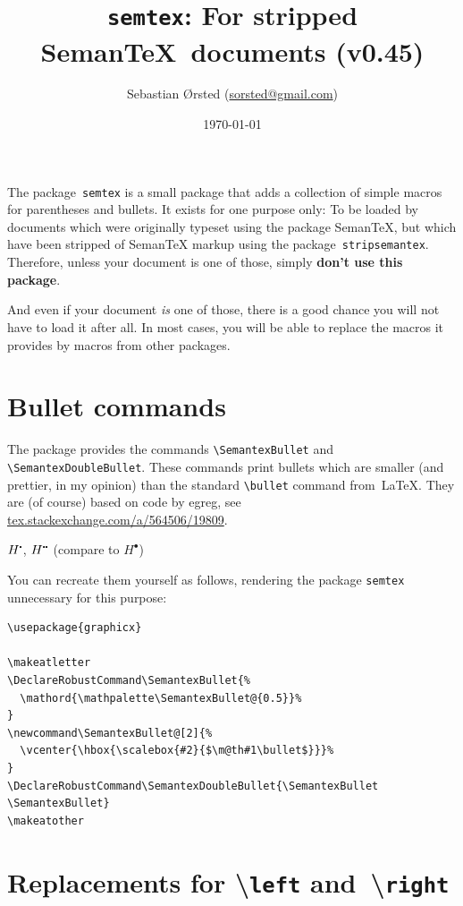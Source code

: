 \documentclass[a4paper,article,oneside,english,10pt]{memoir}
\title{\texttt{semtex}: For stripped Seman\!\TeX\ documents (v0.45)}
\date{\today}
\author{Sebastian Ørsted (\href{mailto:sorsted@gmail.com}{sorsted@gmail.com})}
\newcommand\mylst{\lstinline[mathescape]}
\let\pack=\texttt
\newcommand\semantex{Seman\!\TeX\xspace}
\begin{document}
\maketitle

\noindent
The package~\pack{semtex} is a small package
that adds a collection of simple macros for parentheses
and bullets.
It exists for one purpose only:
To be loaded by documents which were originally typeset
using the package \semantex, but which have been stripped
of \semantex markup using the package~\pack{stripsemantex}.
Therefore, unless your document is one of those,
simply \textbf{don't use this package}.


And even if your document \emph{is} one of those, there is a good chance
you will not have to load it after all. In most cases, you will be able to replace
the macros it provides by macros from other packages.

\chapter*{Bullet commands}

The package provides the commands \mylst!\SemantexBullet! and \mylst!\SemantexDoubleBullet!.
These commands print bullets which are smaller (and prettier, in my opinion)
than the standard \lstinline!\bullet! command from~\LaTeX.
They are (of course) based on code by egreg, see \url{tex.stackexchange.com/a/564506/19809}.
\begin{LTXexample}
$ H^{\SemantexBullet} $,
$ H^{\SemantexDoubleBullet} $
(compare to $H^{\bullet}$)
\end{LTXexample}
You can recreate them yourself as follows, rendering
the package \pack{semtex} unnecessary for this purpose:
\begin{lstlisting}
\usepackage{graphicx}

\makeatletter
\DeclareRobustCommand\SemantexBullet{%
  \mathord{\mathpalette\SemantexBullet@{0.5}}%
}
\newcommand\SemantexBullet@[2]{%
  \vcenter{\hbox{\scalebox{#2}{$\m@th#1\bullet$}}}%
}
\DeclareRobustCommand\SemantexDoubleBullet{\SemantexBullet \SemantexBullet}
\makeatother
\end{lstlisting}
	
\chapter*{Replacements for \texorpdfstring{\textbackslash\texttt{left} and~\textbackslash\texttt{right}}{\left and \right}}
\end{document}
